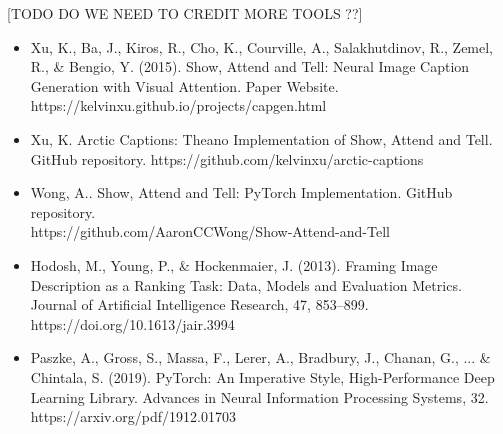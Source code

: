 \documentclass{article}
\begin{document}
[TODO DO WE NEED TO CREDIT MORE TOOLS ??]
\begin{itemize}
    \item Xu, K., Ba, J., Kiros, R., Cho, K., Courville, A., Salakhutdinov, R., Zemel, R., \& Bengio, Y. (2015). Show, Attend and Tell: Neural Image Caption Generation with Visual Attention. Paper Website. \\ https://kelvinxu.github.io/projects/capgen.html
    \item Xu, K. Arctic Captions: Theano Implementation of Show, Attend and Tell. GitHub repository. https://github.com/kelvinxu/arctic-captions 
    \item Wong, A.. Show, Attend and Tell: PyTorch Implementation. GitHub repository. \\ https://github.com/AaronCCWong/Show-Attend-and-Tell
    \item Hodosh, M., Young, P., \& Hockenmaier, J. (2013). Framing Image Description as a Ranking Task: Data, Models and Evaluation Metrics. Journal of Artificial Intelligence Research, 47, 853–899.\\ https://doi.org/10.1613/jair.3994
    \item Paszke, A., Gross, S., Massa, F., Lerer, A., Bradbury, J., Chanan, G., ... \& Chintala, S. (2019). PyTorch: An Imperative Style, High-Performance Deep Learning Library. Advances in Neural Information Processing Systems, 32. \\ https://arxiv.org/pdf/1912.01703
\end{itemize}
\end{document}
